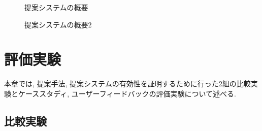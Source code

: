 \documentclass[syuuron]{kuee}
\begin{document}
		\begin{figure}
			\begin{center}
			\end{center}
			\caption{提案システムの概要}
	  		\label{fig:sys1}
		\end{figure}
		\begin{figure}
			\begin{center}
			\end{center}
			\caption{提案システムの概要2}
	  		\label{fig:sys2}
		\end{figure}

\chapter{評価実験}
	本章では, 提案手法, 提案システムの有効性を証明するために行った2組の比較実験とケーススタディ, ユーザーフィードバックの評価実験について述べる. 
	\section{比較実験}
\end{document}
